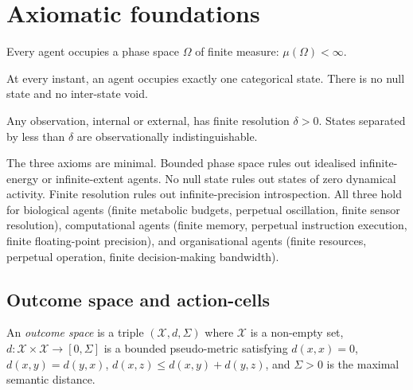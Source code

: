 \documentclass[11pt,twocolumn,a4paper]{article}
\newcommand{\X}{\mathcal{X}}
\begin{document}
\section{Axiomatic foundations}
\label{sec:axioms}

\begin{axiom}\label{ax:bounded}
Every agent occupies a phase space $\Omega$ of finite measure: $\mu(\Omega) < \infty$.
\end{axiom}

\begin{axiom}\label{ax:null}
At every instant, an agent occupies exactly one categorical state. There is no null
state and no inter-state void.
\end{axiom}

\begin{axiom}\label{ax:resolution}
Any observation, internal or external, has finite resolution $\delta > 0$.
States separated by less than $\delta$ are observationally indistinguishable.
\end{axiom}

\begin{remark}\label{rem:axioms}
The three axioms are minimal. Bounded phase space rules out idealised infinite-energy
or infinite-extent agents. No null state rules out states of zero dynamical activity.
Finite resolution rules out infinite-precision introspection. All three hold for
biological agents (finite metabolic budgets, perpetual oscillation, finite sensor
resolution), computational agents (finite memory, perpetual instruction execution,
finite floating-point precision), and organisational agents (finite resources, perpetual
operation, finite decision-making bandwidth).
\end{remark}

\subsection{Outcome space and action-cells}

\begin{definition}\label{def:outcome}
An \emph{outcome space} is a triple $(\X, d, \Sigma)$ where $\X$ is a non-empty set,
$d: \X \times \X \to [0, \Sigma]$ is a bounded pseudo-metric satisfying
$d(x,x)=0$, $d(x,y) = d(y,x)$, $d(x,z) \le d(x,y) + d(y,z)$, and $\Sigma > 0$ is the
maximal semantic distance.
\end{definition}
\end{document}
